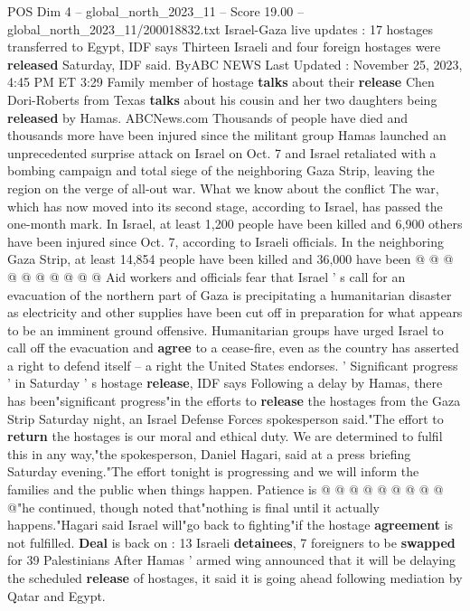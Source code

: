 \begin{textsample}{POS Dim 4 – global\_north\_2023\_11 – Score 19.00 – global\_north\_2023\_11/200018832.txt}  \label{ex:f4_pos_202}
Israel-Gaza live updates : 17 hostages transferred to Egypt, IDF says Thirteen Israeli and four foreign hostages were \textbf{released} Saturday, IDF said.
ByABC NEWS Last Updated : November 25, 2023, 4:45 PM ET 3:29 Family member of hostage \textbf{talks} about their \textbf{release} Chen Dori-Roberts from Texas \textbf{talks} about his cousin and her two daughters being \textbf{released} by Hamas.
ABCNews.com Thousands of people have died and thousands more have been injured since the militant group Hamas launched an unprecedented surprise attack on Israel on Oct. 7 and Israel retaliated with a bombing campaign and total siege of the neighboring Gaza Strip, leaving the region on the verge of all-out war.
What we know about the conflict The war, which has now moved into its second stage, according to Israel, has passed the one-month mark.
In Israel, at least 1,200 people have been killed and 6,900 others have been injured since Oct. 7, according to Israeli officials.
In the neighboring Gaza Strip, at least 14,854 people have been killed and 36,000 have been @ @ @ @ @ @ @ @ @ @ Aid workers and officials fear that Israel ' s call for an evacuation of the northern part of Gaza is precipitating a humanitarian disaster as electricity and other supplies have been cut off in preparation for what appears to be an imminent ground offensive.
Humanitarian groups have urged Israel to call off the evacuation and \textbf{agree} to a cease-fire, even as the country has asserted a right to defend itself -- a right the United States endorses. ' Significant progress ' in Saturday ' s hostage \textbf{release}, IDF says Following a delay by Hamas, there has been"significant progress"in the efforts to \textbf{release} the hostages from the Gaza Strip Saturday night, an Israel Defense Forces spokesperson said."The effort to \textbf{return} the hostages is our moral and ethical duty.
We are determined to fulfil this in any way,"the spokesperson, Daniel Hagari, said at a press briefing Saturday evening."The effort tonight is progressing and we will inform the families and the public when things happen.
Patience is @ @ @ @ @ @ @ @ @ @"he continued, though noted that"nothing is final until it actually happens."Hagari said Israel will"go back to fighting"if the hostage \textbf{agreement} is not fulfilled. \textbf{Deal} is back on : 13 Israeli \textbf{detainees}, 7 foreigners to be \textbf{swapped} for 39 Palestinians After Hamas ' armed wing announced that it will be delaying the scheduled \textbf{release} of hostages, it said it is going ahead following mediation by Qatar and Egypt.

\end{textsample}
